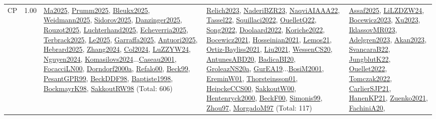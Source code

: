 {\begin{longtable}{p{3cm}r>{\raggedright\arraybackslash}p{6cm}>{\raggedright\arraybackslash}p{6cm}>{\raggedright\arraybackslash}p{8cm}}
\index{CP}\index{CP!CP}CP &  1.00 & \hyperref[detail:Ma2025]{Ma2025}, \hyperref[detail:Prumm2025]{Prumm2025}, \hyperref[detail:Bleukx2025]{Bleukx2025}, \hyperref[detail:Weidmann2025]{Weidmann2025}, \hyperref[detail:Sidorov2025]{Sidorov2025}, \hyperref[detail:Danzinger2025]{Danzinger2025}, \hyperref[detail:Rouzot2025]{Rouzot2025}, \hyperref[detail:Luchterhand2025]{Luchterhand2025}, \hyperref[detail:Echeverria2025]{Echeverria2025}, \hyperref[detail:Terbrack2025]{Terbrack2025}, \hyperref[detail:Le2025]{Le2025}, \hyperref[detail:Garraffa2025]{Garraffa2025}, \hyperref[detail:Antuori2025]{Antuori2025}, \hyperref[detail:Hebrard2025]{Hebrard2025}, \hyperref[detail:Zhang2024]{Zhang2024}, \hyperref[detail:Col2024]{Col2024}, \hyperref[detail:LuZZYW24]{LuZZYW24}, \hyperref[detail:Nguyen2024]{Nguyen2024}, \hyperref[detail:Komasilovs2024]{Komasilovs2024}...\hyperref[detail:Caseau2001]{Caseau2001}, \hyperref[detail:FocacciLN00]{FocacciLN00}, \hyperref[detail:Dorndorf2000a]{Dorndorf2000a}, \hyperref[detail:Refalo00]{Refalo00}, \hyperref[detail:Beck99]{Beck99}, \hyperref[detail:PesantGPR99]{PesantGPR99}, \hyperref[detail:BeckDDF98]{BeckDDF98}, \hyperref[detail:Baptiste1998]{Baptiste1998}, \hyperref[detail:BockmayrK98]{BockmayrK98}, \hyperref[detail:SakkoutRW98]{SakkoutRW98} (Total: 606) & \hyperref[detail:Relich2023]{Relich2023}, \hyperref[detail:NaderiBZR23]{NaderiBZR23}, \hyperref[detail:NaqviAIAAA22]{NaqviAIAAA22}, \hyperref[detail:Tassel22]{Tassel22}, \hyperref[detail:Squillaci2022]{Squillaci2022}, \hyperref[detail:OuelletQ22]{OuelletQ22}, \hyperref[detail:Song2022]{Song2022}, \hyperref[detail:Doolaard2022]{Doolaard2022}, \hyperref[detail:Koriche2022]{Koriche2022}, \hyperref[detail:Bocewicz2021]{Bocewicz2021}, \hyperref[detail:Hosseinian2021]{Hosseinian2021}, \hyperref[detail:Lemos21]{Lemos21}, \hyperref[detail:Ortiz-Bayliss2021]{Ortiz-Bayliss2021}, \hyperref[detail:Liu2021]{Liu2021}, \hyperref[detail:WessenCS20]{WessenCS20}, \hyperref[detail:AntunesABD20]{AntunesABD20}, \hyperref[detail:BadicaBI20]{BadicaBI20}, \hyperref[detail:GroleazNS20a]{GroleazNS20a}, \hyperref[detail:GurEA19]{GurEA19}...\hyperref[detail:BosiM2001]{BosiM2001}, \hyperref[detail:EreminW01]{EreminW01}, \hyperref[detail:Thorsteinsson01]{Thorsteinsson01}, \hyperref[detail:HeipckeCCS00]{HeipckeCCS00}, \hyperref[detail:SakkoutW00]{SakkoutW00}, \hyperref[detail:Hentenryck2000]{Hentenryck2000}, \hyperref[detail:BeckF00]{BeckF00}, \hyperref[detail:Simonis99]{Simonis99}, \hyperref[detail:Zhou97]{Zhou97}, \hyperref[detail:MorgadoM97]{MorgadoM97} (Total: 117) & \hyperref[detail:Assaf2025]{Assaf2025}, \hyperref[detail:LiLZDZW24]{LiLZDZW24}, \hyperref[detail:Bocewicz2023]{Bocewicz2023}, \hyperref[detail:Xu2023]{Xu2023}, \hyperref[detail:IklassovMR023]{IklassovMR023}, \hyperref[detail:Adelgren2023]{Adelgren2023}, \hyperref[detail:Akan2023]{Akan2023}, \hyperref[detail:SvancaraB22]{SvancaraB22}, \hyperref[detail:JungblutK22]{JungblutK22}, \hyperref[detail:Ouellet2022]{Ouellet2022}, \hyperref[detail:Tomczak2022]{Tomczak2022}, \hyperref[detail:CarlierSJP21]{CarlierSJP21}, \hyperref[detail:HanenKP21]{HanenKP21}, \hyperref[detail:Zuenko2021]{Zuenko2021}, \hyperref[detail:FachiniA20]{FachiniA20}, 
\end{longtable}}
